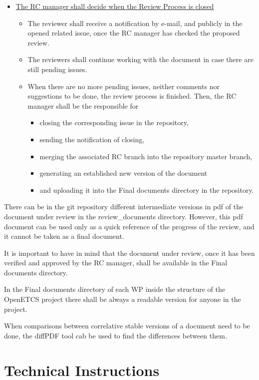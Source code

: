 \documentclass{template/openetcs_article}
\begin{document}
\begin{itemize}
\item \underline{The RC manager shall decide when the Review Process is closed}
\begin{itemize}
\item The reviewer shall receive a notification by e-mail, and publicly in the opened related issue, once the RC manager has checked the proposed review. 
\item The reviewers shall continue working with the document in case there are still pending issues.
\item When there are no more pending issues, neither comments nor suggestions to be done, the review process is finished. Then, the RC manager shall be the responsible for 
\begin{itemize}
\item closing the corresponding issue in the repository, 
\item sending the notification of closing, 
\item merging the associated RC branch into the repository master branch, 
\item generating an established new version of the document 
\item and uploading it into the Final documents directory in the repository.
\end{itemize}
\end{itemize}

\end{itemize}

There can be in the git repository different intermediate versions in pdf of the document under review in the review\_documents directory. However, this pdf document can be used only as a quick reference of the progress of the review, and it cannot be taken as a final document. 

It is important to have in mind that the document under review, once it has been verified and approved by the RC manager, shall be available in the Final documents directory.

In the Final documents directory of each WP inside the structure of the OpenETCS project there shall be always a readable version for anyone in the project. 

When comparisons between correlative stable versions of a document need to be done, the diffPDF tool cab be used to find the differences between them.


\section{Technical Instructions}
\end{document}
